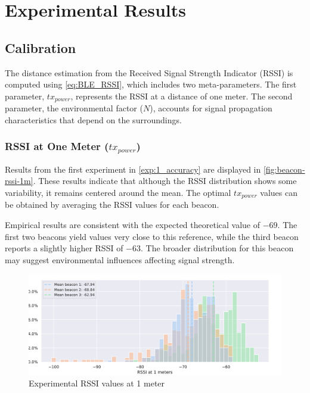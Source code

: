 \chapter{Experimental Results}
\label{chap:results}

\section{Calibration}
The distance estimation from the Received Signal Strength Indicator (RSSI) is computed using \autoref{eq:BLE_RSSI}, which includes two meta-parameters. The first parameter, $tx_{power}$, represents the RSSI at a distance of one meter. The second parameter, the environmental factor ($N$), accounts for signal propagation characteristics that depend on the surroundings.

\subsection{RSSI at One Meter ($tx_{power}$)}
Results from the first experiment in \autoref{exp:1_accuracy} are displayed in \autoref{fig:beacon-rssi-1m}. These results indicate that although the RSSI distribution shows some variability, it remains centered around the mean. The optimal $tx_{power}$ values can be obtained by averaging the RSSI values for each beacon.

Empirical results are consistent with the expected theoretical value of $-69$. The first two beacons yield values very close to this reference, while the third beacon reports a slightly higher RSSI of $-63$. The broader distribution for this beacon may suggest environmental influences affecting signal strength.

\begin{figure}[h]
    \centering
    \includegraphics[width=\linewidth]{assets/beacon-rssi-1m.pdf}
    \caption{Experimental RSSI values at 1 meter}
    \label{fig:beacon-rssi-1m}
\end{figure}

